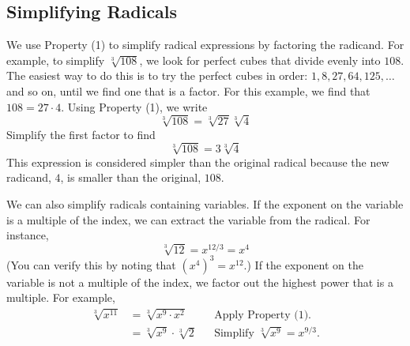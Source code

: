 \documentclass[10pt,]{book}
\theoremstyle{plain}
\theoremstyle{definition}
\theoremstyle{definition}
\theoremstyle{definition}
\numberwithin{equation}{part}
\newcommand{\amp}{&}
\begin{document}
\subsection[{Simplifying Radicals}]{Simplifying Radicals}\label{subsection-44}
We use Property (1) to simplify radical expressions by factoring the radicand. For example, to simplify \(\sqrt[3]{108}\), we look for perfect cubes that divide evenly into \(108\). The easiest way to do this is to try the perfect cubes in order: \(1, 8, 27, 64, 125, \ldots\) and so on, until we find one that is a factor. For this example, we find that \(108 = 27 · 4\). Using Property (1), we write%
\begin{equation*}
\sqrt[3]{108}=\sqrt[3]{27}\sqrt[3]{4} 
\end{equation*}
Simplify the first factor to find%
\begin{equation*}
\sqrt[3]{108}= 3 \sqrt[3]{4} 
\end{equation*}
This expression is considered simpler than the original radical because the new radicand, \(4\), is smaller than the original, \(108\).%
\par
We can also simplify radicals containing variables. If the exponent on the variable is a multiple of the index, we can extract the variable from the radical. For instance,%
\begin{equation*}
\sqrt[3]{12}=x^{12/3}=x^4 
\end{equation*}
(You can verify this by noting that \((x^4)^3 = x^{12}\).) If the exponent on the variable is not a multiple of the index, we factor out the highest power that is a multiple. For example,%
\begin{align*}
\sqrt[3]{x^{11}} \amp = \sqrt[3]{x^9 \cdot x^2}\amp\amp\text{Apply Property (1).}
\\
\amp = \sqrt[3]{x^9}\cdot\sqrt[3]{2} \amp\amp\text{Simplify }\sqrt[3] {x^9}=x^{9/3}. 
\end{align*}
%
\begin{align*}

\end{align*}
%
\end{document}
